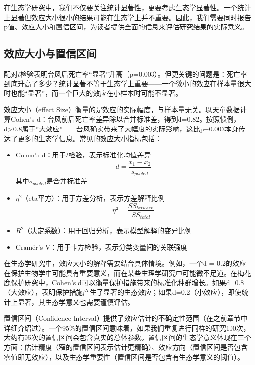 \documentclass[
  twoside,12pt,fontset=none]{ctexbook}
\begin{document}
在生态学研究中，我们不仅要关注统计显著性，更要考虑生态学显著性。一个统计上显著但效应大小很小的结果可能在生态学上并不重要。因此，我们需要同时报告p值、效应大小和置信区间，为读者提供全面的信息来评估研究结果的实际意义。

\hypertarget{ux6548ux5e94ux5927ux5c0fux4e0eux7f6eux4fe1ux533aux95f4}{%
\subsection{效应大小与置信区间}\label{ux6548ux5e94ux5927ux5c0fux4e0eux7f6eux4fe1ux533aux95f4}}

配对\(t\)检验表明台风后死亡率``显著''升高（p=0.003）。但更关键的问题是：死亡率到底升高了多少？统计显著不等于生态学上重要------一个微小的效应在样本量很大时也能``显著''，而一个巨大的效应在小样本时可能不显著。

效应大小（effect Size）衡量的是效应的实际幅度，与样本量无关。以天童数据计算Cohen's d：台风前后死亡率差异除以合并标准差，得到d=0.82。按照惯例，d\textgreater0.8属于''大效应''------台风确实带来了大幅度的实际影响，这比p=0.003本身传达了更多的生态学信息。常见的效应大小指标包括：

\begin{itemize}
\item
  Cohen's d：用于\(t\)检验，表示标准化均值差异
  \[d = \frac{\bar{x}_1 - \bar{x}_2}{s_{pooled}}\]
  其中\(s_{pooled}\)是合并标准差
\item
  \(\eta^2\)（eta平方）：用于方差分析，表示方差解释比例
  \[\eta^2 = \frac{SS_{between}}{SS_{total}}\]
\item
  \(R^2\)（决定系数）：用于回归分析，表示模型解释的变异比例
\item
  Cramér's V：用于卡方检验，表示分类变量间的关联强度
\end{itemize}

在生态学研究中，效应大小的解释需要结合具体情境。例如，一个d = 0.2的效应在保护生物学中可能具有重要意义，而在某些生理学研究中可能微不足道。在梅花鹿保护研究中，Cohen's d可以衡量保护措施带来的标准化种群增长。如果d=0.8（大效应），表明保护措施产生了显著的生态效应；如果d=0.2（小效应），即使统计上显著，其生态学意义也需要谨慎评估。

置信区间（Confidence Interval）提供了效应估计的不确定性范围（在之前章节中详细介绍过）。一个95\%的置信区间意味着，如果我们重复进行同样的研究100次，大约有95次的置信区间会包含真实的总体参数。置信区间的生态学意义体现在三个方面：估计精度（窄的置信区间表示估计更精确）、效应方向（置信区间是否包含零值即无效应），以及生态学重要性（置信区间是否包含有生态学意义的阈值）。
\end{document}
